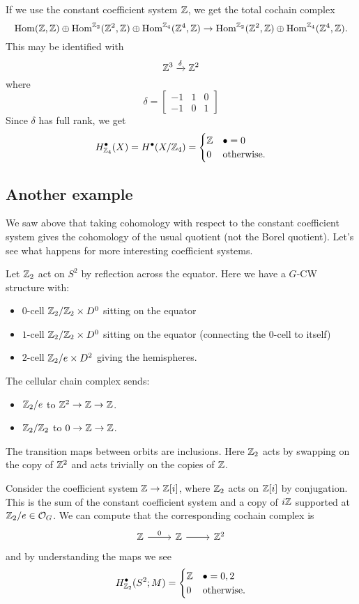 \documentclass{article}
\begin{document}
\begin{ex}
  If we use the constant coefficient system $\mathbb{Z}$, we get the total cochain complex
  \[
    \operatorname{Hom}(\mathbb{Z}, \mathbb{Z}) \oplus \operatorname{Hom}^{\mathbb{Z}_2}(\mathbb{Z}^2, \mathbb{Z}) \oplus \operatorname{Hom}^{\mathbb{Z}_4}(\mathbb{Z}^4, \mathbb{Z}) \to \operatorname{Hom}^{\mathbb{Z}_2}(\mathbb{Z}^2, \mathbb{Z}) \oplus \operatorname{Hom}^{\mathbb{Z}_4}(\mathbb{Z}^4, \mathbb{Z}).
  \]
  This may be identified with
  \[
    \mathbb{Z}^3 \xrightarrow{\delta} \mathbb{Z}^2
  \]
  where
  \[
    \delta = \begin{bmatrix}
      -1 & 1 & 0 \\
      -1 & 0 & 1
    \end{bmatrix}
  \]
  Since $\delta$ has full rank, we get 
  \[
    H^\bullet_{\mathbb{Z}_4}(X) = H^\bullet(X/\mathbb{Z}_4) = \begin{cases}
      \mathbb{Z} & \bullet = 0 \\
      0 & \textrm{otherwise.}
    \end{cases}
  \]
\end{ex}

\subsection{Another example}

We saw above that taking cohomology with respect to the constant coefficient system gives the cohomology of the usual quotient (not the Borel quotient).
Let's see what happens for more interesting coefficient systems.

\begin{ex}
  Let $\mathbb{Z}_2$ act on $S^2$ by reflection across the equator.
  Here we have a $G$-CW structure with:
  \begin{itemize}
    \item $0$-cell $\mathbb{Z}_2 / \mathbb{Z}_2 \times D^0$ sitting on the equator
    \item $1$-cell $\mathbb{Z}_2 / \mathbb{Z}_2 \times D^0$ sitting on the equator (connecting the $0$-cell to itself)
    \item $2$-cell $\mathbb{Z}_2 / e \times D^2$ giving the hemispheres.
  \end{itemize}
  The cellular chain complex sends:
  \begin{itemize}
    \item $\mathbb{Z}_2 / e$ to $\mathbb{Z}^2 \to \mathbb{Z} \to \mathbb{Z}$.
    \item $\mathbb{Z}_2 / \mathbb{Z}_2$ to $0 \to \mathbb{Z} \to \mathbb{Z}$.
  \end{itemize}
  The transition maps between orbits are inclusions.
  Here $\mathbb{Z}_2$ acts by swapping on the copy of $\mathbb{Z}^2$ and acts trivially on the copies of $\mathbb{Z}$.

  Consider the coefficient system $\mathbb{Z} \to \mathbb{Z}[i]$, where $\mathbb{Z}_2$ acts on $\mathbb{Z}[i]$ by conjugation.
  This is the sum of the constant coefficient system and a copy of $i\mathbb{Z}$ supported at $\mathbb{Z}_2 / e \in \mathcal{O}_G$.
  We can compute that the corresponding cochain complex is
  \[
    \begin{tikzcd}
      \ZZ \rar["0"] & \ZZ \rar & \ZZ^2
    \end{tikzcd}
  \]
  and by understanding the maps we see
  \[
    H^\bullet_{\mathbb{Z}_2}(S^2; M) = \begin{cases}
      \mathbb{Z} & \bullet = 0, 2 \\
      0 & \textrm{otherwise.}
    \end{cases}
  \]
\end{ex}
\end{document}
